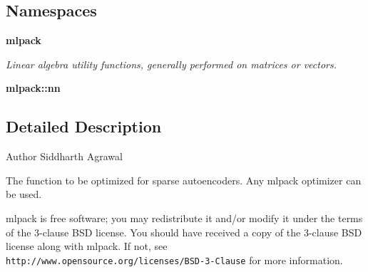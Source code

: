 \subsection*{Namespaces}
\begin{DoxyCompactItemize}
\item 
 {\bf mlpack}
\begin{DoxyCompactList}\small\item\em Linear algebra utility functions, generally performed on matrices or vectors. \end{DoxyCompactList}\item 
 {\bf mlpack\+::nn}
\end{DoxyCompactItemize}


\subsection{Detailed Description}
\begin{DoxyAuthor}{Author}
Siddharth Agrawal
\end{DoxyAuthor}
The function to be optimized for sparse autoencoders. Any mlpack optimizer can be used.

mlpack is free software; you may redistribute it and/or modify it under the terms of the 3-\/clause B\+SD license. You should have received a copy of the 3-\/clause B\+SD license along with mlpack. If not, see {\tt http\+://www.\+opensource.\+org/licenses/\+B\+S\+D-\/3-\/\+Clause} for more information. 